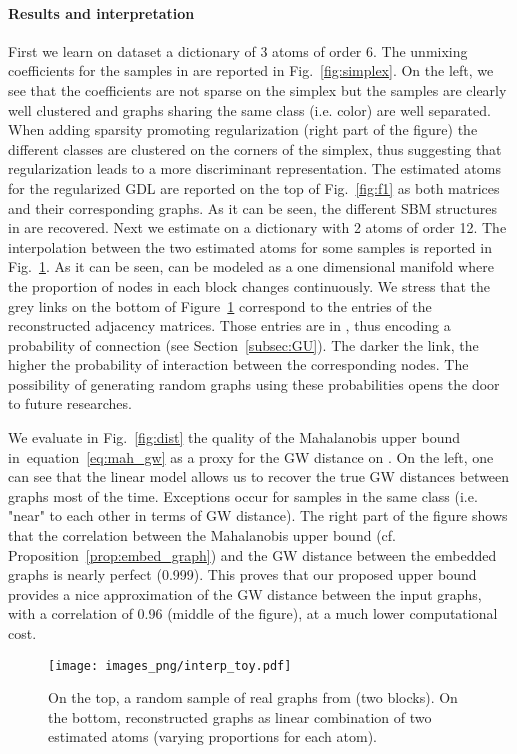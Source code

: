 \documentclass{article}
\def\eqref#1{equation~\ref{#1}}
\begin{document}
	\paragraph{Results and interpretation} First we learn on dataset  a dictionary
	of 3 atoms of order 6. The unmixing coefficients for the
	samples in  are reported in Fig.~\ref{fig:simplex}. On the left, we see that the coefficients are not sparse on the simplex but the samples are clearly
	well clustered and graphs sharing the same class (i.e. color) are well separated.  
	When adding sparsity promoting regularization  (right part of the figure) the
	different classes are clustered on the corners of the simplex, thus suggesting
	that regularization leads to a more discriminant representation. The estimated atoms
	for the regularized GDL are reported on the top of Fig.~\ref{fig:f1} as both
	matrices  and their corresponding graphs.
	As it can be seen, the different SBM structures in  are recovered.
	Next we estimate on  a dictionary with 2 atoms of order 12. 
	The interpolation between the two estimated atoms for some samples is reported in Fig.~\ref{fig:interp_toy}.
	As it can be seen,  can be modeled as a one dimensional manifold where the
	proportion of nodes in each block changes continuously. We stress that the grey links on the bottom of Figure~\ref{fig:interp_toy} correspond to the entries of the reconstructed adjacency matrices. Those entries are in , thus encoding a probability of connection (see Section~\ref{subsec:GU}). 
	The darker the link, the higher the probability of interaction between the corresponding nodes. The possibility of generating random graphs using
	these probabilities opens the door to future researches.
	
	We evaluate in Fig.~\ref{fig:dist} the
	quality of the Mahalanobis upper bound in~\eqref{eq:mah_gw} as a proxy for the GW distance on
	. 
	On the left, one can see that the linear model allows us to recover the true GW distances between graphs most of the time.
	Exceptions occur for samples in the same class (i.e.  "near" to each other in terms of GW distance).
	The right part of the figure shows that the
	correlation between the Mahalanobis upper bound (cf. Proposition~\ref{prop:embed_graph}) and the GW distance between the
	embedded graphs is nearly perfect (0.999). This proves that our proposed upper bound
	provides a nice approximation of the GW distance between the input graphs, with a correlation of 0.96 (middle of the figure), at a much lower computational cost.  
	
	\begin{figure}[t]
		\centering
		\texttt{[image: images\_png/interp\_toy.pdf]}\vspace{-2mm}
		\caption{On the top, a random sample of real graphs from  (two blocks). 
			On the bottom, reconstructed graphs as linear combination of two estimated atoms (varying proportions for each atom).} \label{fig:interp_toy}
	\end{figure}
	
\end{document}
